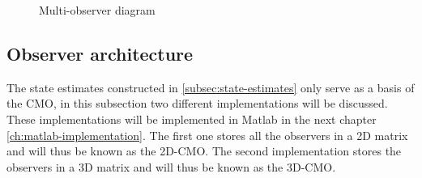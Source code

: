 \begin{figure}[h]
    \caption{Multi-observer diagram}
    \label{fig:multi-observer-diagram}
\end{figure}

\subsection{Observer architecture}\label{subsec:CMO-architecture}
The state estimates constructed in \ref{subsec:state-estimates} only serve as a basis of the CMO, in this subsection two different implementations will be discussed. These implementations will be implemented in Matlab in the next chapter \ref{ch:matlab-implementation}. The first one  stores all the observers in a 2D matrix and will thus be known as the 2D-CMO. The second implementation stores the observers in a 3D matrix and will thus be known as the 3D-CMO.

